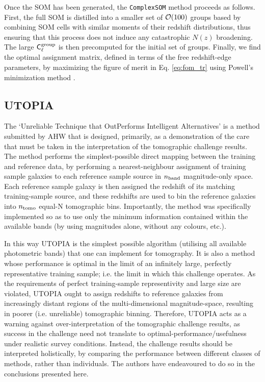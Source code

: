 \documentclass[twocolumn,twocolappendix]{aastex63}
\begin{document}
Once the SOM has been generated, the {\tt ComplexSOM} method proceeds as
follows. First, the full SOM is distilled into a smaller set of ${\cal O}(100)$
groups based by combining SOM cells with similar moments of their redshift
distributions, thus ensuring that this process does not induce any catastrophic
$N(z)$ broadening.
The large ${\sf C}^{\rm group}_\ell$ is then precomputed for the initial set of
groups. Finally, we find the optimal assignment matrix, defined in terms of the
free redshift-edge parameters, by maximizing the figure of merit in Eq.
\ref{eq:fom_tr} using Powell's minimization method
\citep{10.1093/comjnl/7.2.155}.




\subsection{ {\sc UTOPIA} }\label{sec:utopia}

The `Unreliable Technique that OutPerforms Intelligent Alternatives' is a method
submitted by AHW that is designed,  primarily, as a demonstration of the care
that must be taken in the interpretation of the tomographic challenge results. 
The method performs  the simplest-possible direct mapping between the training
and reference data, by performing a nearest-neighbour  assignment of training
sample galaxies to each reference sample source in $n_{\rm band}$ magnitude-only
space. Each reference  sample galaxy is then assigned the redshift of its
matching training-sample source, and these redshifts are  used to bin the
reference galaxies into $n_{\rm tomo}$ equal-N tomographic bins. Importantly,
the method was specifically  implemented so as to use only the minimum
information contained within the available bands (by using magnitudes alone,
without  any colours, etc.). 

In this way \textsc{UTOPIA} is the simplest possible algorithm (utilising all available
photometric bands) that one can  implement for tomography. It is also a method
whose performance is optimal in the limit of an infinitely large,  perfectly
representative training sample; i.e. the limit in which this challenge operates.
As the requirements of perfect  training-sample representivity and large size
are violated, \textsc{UTOPIA} ought to assign redshifts to reference  galaxies from
increasingly distant regions of the multi-dimensional magnitude-space, resulting
in poorer (i.e. unreliable) tomographic binning.  Therefore, \textsc{UTOPIA} acts as a warning against
over-interpretation of the tomographic challenge results, as success in the
challenge  need not translate to optimal-performance/usefulness under realistic
survey conditions. Instead, the challenge results should be interpreted
holistically, by comparing the performance between different classes of methods,
rather than individuals. The authors have endeavoured to do so in the conclusions presented here.
\end{document}
